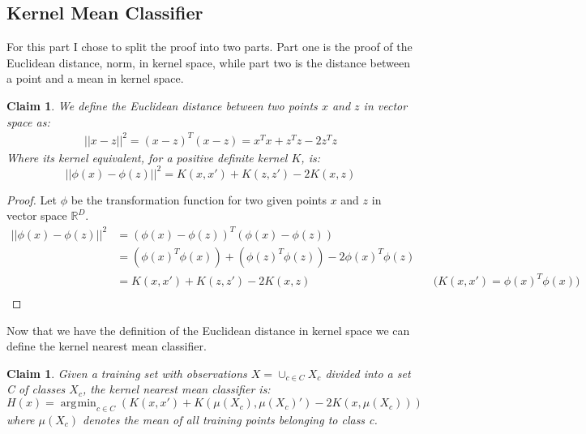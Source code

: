 \documentclass{article}
\DeclareMathOperator*{\argmin}{\arg\!\min}
\theoremstyle{plain}
\newtheorem{claim}[equation]{Claim}
\theoremstyle{nonumberplain}
\newtheorem{proof}{Proof}
\begin{document}
\subsection{Kernel Mean Classifier}
For this part I chose to split the proof into two parts.
Part one is the proof of the Euclidean distance, norm, in kernel space, while part two is the distance between a point and a mean in kernel space.
\bigskip
\begin{claim}
We define the Euclidean distance between two points $x$ and $z$ in vector space as: \\
\begin{align*}
|| x - z ||^2 = (x - z)^T(x-z) = x^T x + z^T z - 2z^Tz
\end{align*}
Where its kernel equivalent, for a positive definite kernel $K$, is:
\begin{equation} \label{eq:keuclidean}
|| \phi(x) - \phi(z) ||^2 = K(x,x')+K(z,z')-2K(x,z)
\end{equation}
\end{claim}

\begin{proof}
Let $\phi$ be the transformation function for two given points $x$ and $z$ in vector space $\mathbb{R}^D$.
	\begin{align*}
	|| \phi(x) - \phi(z) ||^2
		&= (\phi(x)- \phi(z))^T ( \phi(x) - \phi(z))\\
		&= (\phi(x)^T \phi(x))+( \phi(z)^T \phi(z)) - 2 \phi(x)^T \phi(z) \\
		&= K(x,x')+K(z,z')-2K(x,z) && \text{($K(x,x') = \phi(x)^T \phi(x)$)} \\
	\end{align*}
\end{proof}


\noindent Now that we have the definition of the Euclidean distance in kernel space we can define the kernel nearest mean classifier.
\begin{claim}
Given a training set with observations $X = \cup_{c \in C}X_c$ divided into a set C of classes $X_c$, the kernel nearest mean classifier is:
\begin{equation} \label{eq:kernelmean}
H(x) = \argmin_{c \in C}(K(x,x')+K(\mu(X_c),\mu(X_c)')-2K(x,\mu(X_c)) ) 
\end{equation}
where $\mu(X_c)$ denotes the mean of all training points belonging to class c.
\end{claim} 
\end{document}

